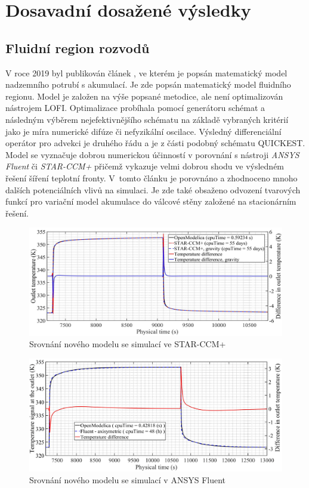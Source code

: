 \section{Dosavadní dosažené výsledky}
\label{sec:Finished_parts}
\subsection*{Fluidní region rozvodů}
V roce 2019 byl publikován článek \cite{Kudela2019pipe}, ve kterém je popsán
matematický model nadzemního potrubí s akumulací. Je zde popsán matematický
model fluidního regionu. Model je založen na výše popsané metodice, ale není
optimalizován nástrojem LOFI. Optimalizace probíhala pomocí generátoru schémat
a následným výběrem nejefektivnějšího schématu na základě vybraných kritérií
jako je míra numerické difúze či nefyzikální oscilace. Výsledný differenciální
operátor pro advekci je druhého řádu a je z části podobný schématu QUICKEST.
Model se vyznačuje dobrou numerickou účinností v porovnání s nástroji
\textit{ANSYS Fluent} či \textit{\mbox{STAR-CCM+}} přičemž vykazuje velmi
dobrou shodu ve výsledném řešení šíření teplotní fronty. V~tomto článku je
porovnáno a zhodnoceno mnoho dalších potenciálních vlivů na simulaci. Je zde
také obsaženo odvození tvarových funkcí pro variační model akumulace do válcové
stěny založené na stacionárním řešení.
\begin{figure}[h]
  \begin{center}
    \includegraphics[scale=0.7]{figures/pipe_CCM_OM}
  \end{center}
  \caption{Srovnání nového modelu se simulací ve STAR-CCM+}
  \label{fig:}
\end{figure}
\begin{figure}[h]
  \begin{center}
    \includegraphics[scale=0.7]{figures/pipe_Fluent_OM}
  \end{center}
  \caption{Srovnání nového modelu se simulací v ANSYS Fluent}
  \label{fig:}
\end{figure}

